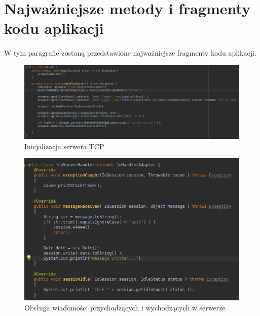 \documentclass{article}
\begin{document}
	\section{Najważniejsze metody i fragmenty kodu aplikacji}
	\paragraph*{} W tym paragrafie zostaną przedstawione najważniejsze fragmenty kodu aplikacji.
	\begin{figure}[H]
		\centering
		\hspace*{-1cm} 
		\includegraphics[scale=0.5]{server.png}
		\caption[]{Inicjalizacja serwera TCP}
		\label{fig:server}
	\end{figure}
	\begin{figure}[H]
		\centering
		\includegraphics[scale=0.7]{serverHandler.png}
		\caption[]{Obsługa wiadomości przychodzących i wychodzących w serwerze}
		\label{fig:serverHandler}
	\end{figure}
\end{document}
